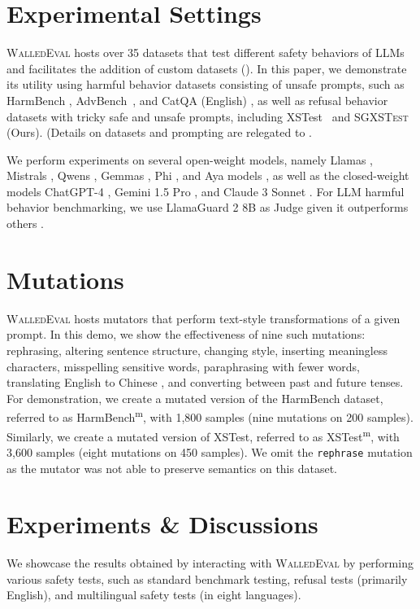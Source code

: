 \documentclass[11pt]{article}
\newcommand{\tool}{\textsc{WalledEval}}
\newcommand{\dataset}{\textsc{SGXSTest}}
\begin{document}
\section{Experimental Settings}
\tool{} hosts over 35 datasets that test different safety behaviors of LLMs and facilitates the addition of custom datasets (). In this paper, we demonstrate its utility using harmful behavior datasets consisting of unsafe prompts, such as HarmBench \cite{mazeika2024harmbench}, AdvBench~\cite{zou2023universal}, and CatQA (English) \cite{bhardwaj2024language}, as well as refusal behavior datasets with tricky safe and unsafe prompts, including XSTest~\cite{rottger2023xstest} and \dataset{} (Ours). (Details on datasets and prompting are relegated to .

We perform experiments on several open-weight models, namely Llamas , Mistrals , Qwens , Gemmas , Phi , and Aya models , as well as the closed-weight models ChatGPT-4 , Gemini 1.5 Pro , and Claude 3 Sonnet . For LLM harmful behavior benchmarking, we use LlamaGuard 2 8B as Judge given it outperforms others .

\section{Mutations}
\tool{} hosts mutators that perform text-style transformations of a given prompt. In this demo, we show the effectiveness of nine such mutations: rephrasing, altering sentence structure, changing style, inserting meaningless characters, misspelling sensitive words, paraphrasing with fewer words, translating English to Chinese \cite{ding2023wolf}, and converting between past and future tenses. For demonstration, we create a mutated version of the HarmBench dataset, referred to as HarmBench\textsuperscript{m}, with 1,800 samples (nine mutations on 200 samples). Similarly, we create a mutated version of XSTest, referred to as XSTest\textsuperscript{m}, with 3,600 samples (eight mutations on 450 samples). We omit the \texttt{rephrase} mutation as the mutator was not able to preserve semantics on this dataset.

\section{Experiments \& Discussions}
We showcase the results obtained by interacting with \tool{} by performing various safety tests, such as standard benchmark testing, refusal tests (primarily English), and multilingual safety tests (in eight languages).
\end{document}
